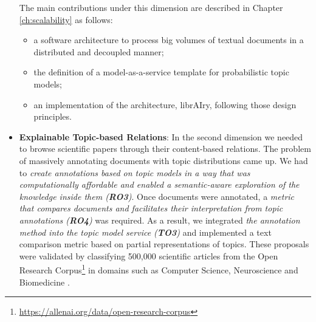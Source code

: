 \begin{itemize}
The main contributions under this dimension are described in Chapter \ref{ch:scalability} as follows:
\begin{itemize}
\item a software architecture to process big volumes of textual documents in a distributed and decoupled manner;
\item the definition of a model-as-a-service template for probabilistic topic models;
\item an implementation of the architecture, librAIry, following those design principles.
\end{itemize} 
\item \textbf{Explainable Topic-based Relations}: In the second dimension we needed to browse scientific papers through their content-based relations. The problem of massively annotating documents with topic distributions came up. We had to \textit{create annotations based on topic models in a way that was computationally affordable and enabled a semantic-aware exploration of the knowledge inside them (\textbf{RO3})}. Once documents were annotated, a \textit{metric that compares documents and facilitates their interpretation from topic annotations (\textbf{RO4})} was required. As a result, we integrated \textit{the annotation method into the topic model service (\textbf{TO3})} and implemented a text comparison metric based on partial representations of topics. These proposals were validated by classifying 500,000 scientific articles from the Open Research Corpus\footnote{\url{https://allenai.org/data/open-research-corpus}} in domains such as Computer Science, Neuroscience and Biomedicine \citep{Badenes-Olmedo2017b, Badenes-Olmedo2017c, Badenes-Olmedo2019b}. 


\end{itemize}
